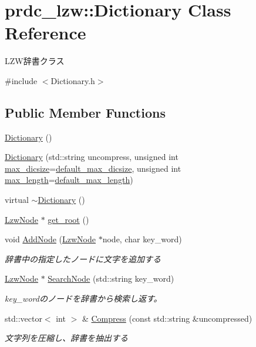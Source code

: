 \hypertarget{classprdc__lzw_1_1Dictionary}{\section{prdc\-\_\-lzw\-:\-:Dictionary Class Reference}
\label{classprdc__lzw_1_1Dictionary}
}


L\-Z\-W辞書クラス  




{\ttfamily \#include $<$Dictionary.\-h$>$}

\subsection*{Public Member Functions}
\begin{DoxyCompactItemize}
\item 
\hyperlink{classprdc__lzw_1_1Dictionary_a7a53efd7967e59748f321938aa983368}{Dictionary} ()
\item 
\hyperlink{classprdc__lzw_1_1Dictionary_a648b9b083fe208246fccfe01be0f7ac3}{Dictionary} (std\-::string uncompress, unsigned int \hyperlink{classprdc__lzw_1_1Dictionary_a27f3bda2d7baeb3c7a62db57de66ffb7}{max\-\_\-dicsize}=\hyperlink{namespaceprdc__lzw_a32802f5b39a1712fd52ea244bed3abc6}{default\-\_\-max\-\_\-dicsize}, unsigned int \hyperlink{classprdc__lzw_1_1Dictionary_a1545e7874d133c508cd3e40f3c150b90}{max\-\_\-length}=\hyperlink{namespaceprdc__lzw_a563099246f7864f678056d3c7e583dbf}{default\-\_\-max\-\_\-length})
\item 
virtual \hyperlink{classprdc__lzw_1_1Dictionary_a953fce0e9128a8e48b62779fdefcc051}{$\sim$\-Dictionary} ()
\item 
\hyperlink{classprdc__lzw_1_1LzwNode}{Lzw\-Node} $\ast$ \hyperlink{classprdc__lzw_1_1Dictionary_ace4e2c68498b30456868e9b3e8f3f300}{get\-\_\-root} ()
\item 
void \hyperlink{classprdc__lzw_1_1Dictionary_ad9a68c58a75d9eec5eb2aaf528b9fbe4}{Add\-Node} (\hyperlink{classprdc__lzw_1_1LzwNode}{Lzw\-Node} $\ast$node, char key\-\_\-word)
\begin{DoxyCompactList}\small\item\em 辞書中の指定したノードに文字を追加する \end{DoxyCompactList}\item 
\hyperlink{classprdc__lzw_1_1LzwNode}{Lzw\-Node} $\ast$ \hyperlink{classprdc__lzw_1_1Dictionary_a4d5f9c58f6aede7507b08d07d0ad7875}{Search\-Node} (std\-::string key\-\_\-word)
\begin{DoxyCompactList}\small\item\em key\-\_\-wordのノードを辞書から検索し返す。 \end{DoxyCompactList}\item 
std\-::vector$<$ int $>$ \& \hyperlink{classprdc__lzw_1_1Dictionary_a2586d5404a25de549bec3629202d9675}{Compress} (const std\-::string \&uncompressed)
\begin{DoxyCompactList}\small\item\em 文字列を圧縮し、辞書を抽出する \end{DoxyCompactList}\end{DoxyCompactItemize}
